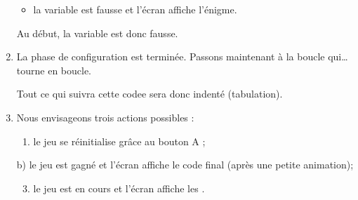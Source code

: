 \documentclass[letterpaper,10pt,french]{sphinxmanual}
\begin{document}
\begin{enumerate}
\begin{itemize}
\item {} 
la variable  est fausse et l’écran
affiche l’énigme.

\end{itemize}

Au début, la variable est donc fausse.

%
\begin{sphinxVerbatim}[commandchars=\\\{\}]
  
\end{sphinxVerbatim}

\item {} 
La phase de configuration est terminée. Passons maintenant à
la boucle qui… tourne en boucle.

Tout ce qui suivra cette codee sera donc indenté (tabulation).

%
\begin{sphinxVerbatim}[commandchars=\\\{\}]
 
\end{sphinxVerbatim}

\item {} 
Nous envisageons trois actions possibles :
\begin{enumerate}
\item {} 
le jeu se réinitialise grâce au bouton A ;

%
\begin{sphinxVerbatim}[commandchars=\\\{\}]
     
          
\end{sphinxVerbatim}

\end{enumerate}

b) le jeu est gagné et l’écran affiche le code final
(après une petite animation);
\begin{quote}

%
\begin{sphinxVerbatim}[commandchars=\\\{\}]
     
\end{sphinxVerbatim}
\end{quote}
\begin{enumerate}
\setcounter{enumii}{2}
\item {} 
le jeu est en cours et l’écran affiche les .


\end{enumerate}
\end{enumerate}
\end{document}
